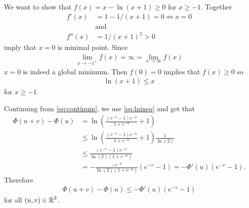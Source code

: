 \begin{enumerate}
\begin{enumerate}
    We want to show that $f(x) = x - \ln(x+1) \geq 0$
    for $x \geq -1$.
    Together 
    \begin{align}
        f'(x) &= 1 - 1/(x+1)  = 0 \Leftrightarrow x = 0
        \nonumber \\ &\textrm {and} \nonumber \\
        f''(x) &= 1/(x+1)^2 > 0
        \nonumber
    \end{align}
    imply that $x=0$ is minimal point.
    Since 
    \begin{align}
        \lim_{x\rightarrow -1^+} f(x) = \infty
        = \lim_{x\rightarrow \infty} f(x)
        \nonumber
    \end{align}
    $x=0$ is indeed a global minimum.
    Then $f(0)=0$ implies that $f(x) \geq 0$ so
    \begin{align}\label{eq:lnineq}
        \ln(x+1) \leq x
    \end{align}
    for $x \geq -1$.

    Continuing from \autoref{eq:continuin},
    we use \autoref{eq:lnineq} and get that
    \begin{align}
        \Phi(u+v) - \Phi(u) &= 
        \ln \left( \frac{(e^{-v}-1)e^{-u}}{1+e^{-u}} +1
        \right) \nonumber \\
        &\leq
        \ln \left( \frac{(e^{-v}-1)e^{-u}}{1+e^{-u}} +1
        \right) 
        \frac{1}{\ln(2)} \nonumber \\
        &\leq \frac{(e^{-v}-1)e^{-u}}{\ln(2)(1+e^{-u})}
        \nonumber \\
        &= -\frac{-e^{-u}}{\ln(2)(1+e^{-u})}(e^{-v}-1)
        = -\Phi'(u) (e^{-v}-1).
        \nonumber
    \end{align}
    Therefore
    \begin{align}\label{eq:phiinequal}
        \Phi(u+v) - \Phi(u)
        \leq -\Phi'(u) (e^{-v}-1)
    \end{align}
    for all $(u,v) \in \operatorname*{\mathbb{R}}^2$.


\end{enumerate}
\end{enumerate}
